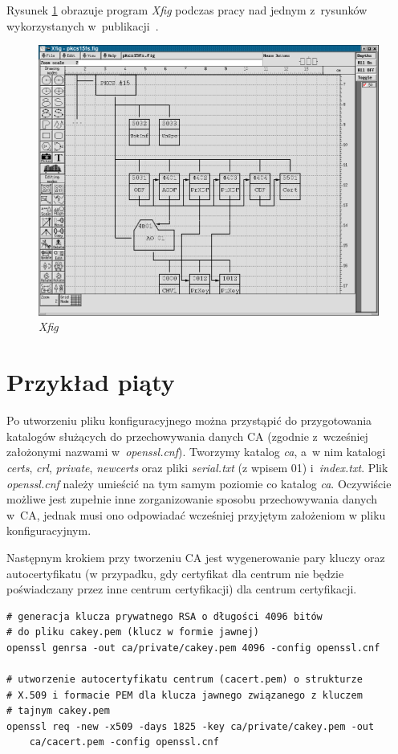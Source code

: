 Rysunek \ref{fig:xfig} obrazuje program {\it Xfig} podczas pracy nad jednym
z~rysunków wykorzystanych w~publikacji~\cite{bk:ipki}.
\begin{figure}[htb]
    \begin{center}
    \includegraphics[angle=0,scale=.35]{img/xfig.png}
    \end{center}
    \caption{\em Xfig}
    \label{fig:xfig}
\end{figure}

\section{Przykład piąty}

Po utworzeniu pliku konfiguracyjnego można przystąpić do przygotowania
katalogów służących do przechowywania danych CA (zgodnie z~wcześniej
założonymi nazwami w~{\em openssl.cnf}). Tworzymy katalog {\em ca}, a~w nim
katalogi {\em certs}, {\em crl}, {\em private}, {\em newcerts} oraz pliki
{\em serial.txt} (z wpisem 01) i~{\em index.txt}. Plik {\em openssl.cnf} należy
umieścić na tym samym poziomie co katalog {\em ca}. Oczywiście możliwe jest
zupełnie inne zorganizowanie sposobu przechowywania danych w~CA, jednak
musi ono odpowiadać wcześniej przyjętym założeniom w pliku konfiguracyjnym.

Następnym krokiem przy tworzeniu CA jest wygenerowanie pary kluczy oraz
autocertyfikatu (w przypadku, gdy certyfikat dla centrum nie będzie
poświadczany przez inne centrum certyfikacji) dla centrum certyfikacji.

\begin{verbatim}
# generacja klucza prywatnego RSA o długości 4096 bitów
# do pliku cakey.pem (klucz w formie jawnej)
openssl genrsa -out ca/private/cakey.pem 4096 -config openssl.cnf

# utworzenie autocertyfikatu centrum (cacert.pem) o strukturze
# X.509 i formacie PEM dla klucza jawnego związanego z kluczem
# tajnym cakey.pem
openssl req -new -x509 -days 1825 -key ca/private/cakey.pem -out
    ca/cacert.pem -config openssl.cnf
\end{verbatim}

